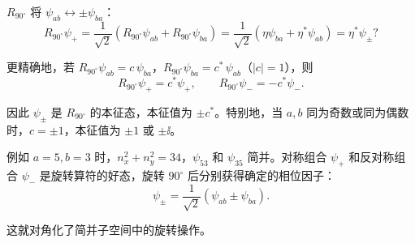 \begin{solution}
	$R_{90^\circ}$ 将 $\psi_{ab}\leftrightarrow\pm\psi_{ba}$：
	\[
	R_{90^\circ}\psi_+ = \frac{1}{\sqrt{2}}(R_{90^\circ}\psi_{ab}+R_{90^\circ}\psi_{ba})
	= \frac{1}{\sqrt{2}}(\eta\psi_{ba}+\eta^*\psi_{ab}) = \eta^*\psi_\pm?
	\]

	更精确地，若 $R_{90^\circ}\psi_{ab} = c\,\psi_{ba}$，$R_{90^\circ}\psi_{ba} = c^*\,\psi_{ab}$（$|c|=1$），则
	\[
	R_{90^\circ}\psi_+ = c^*\psi_+,\qquad
	R_{90^\circ}\psi_- = -c^*\psi_-.
	\]

	因此 $\psi_\pm$ 是 $R_{90^\circ}$ 的本征态，本征值为 $\pm c^*$。特别地，当 $a,b$ 同为奇数或同为偶数时，$c=\pm1$，本征值为 $\pm1$ 或 $\pm\ii$。

	例如 $a=5,b=3$ 时，$n_x^2+n_y^2=34$，$\psi_{53}$ 和 $\psi_{35}$ 简并。对称组合 $\psi_+$ 和反对称组合 $\psi_-$ 是旋转算符的好态，旋转 $90^\circ$ 后分别获得确定的相位因子：
	\[
	\boxed{\psi_\pm = \frac{1}{\sqrt{2}}(\psi_{ab}\pm\psi_{ba})}.
	\]

	这就对角化了简并子空间中的旋转操作。
	\end{solution}

